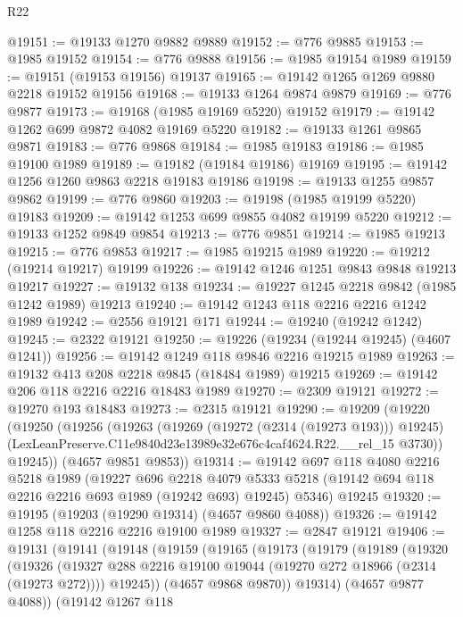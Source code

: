\begin{lexlean}{R22}
\begin{coremodule}
@19151 := @19133 @1270 @9882 @9889
@19152 := @776 @9885
@19153 := @1985 @19152
@19154 := @776 @9888
@19156 := @1985 @19154 @1989
@19159 := @19151 (@19153 @19156) @19137
@19165 := @19142 @1265 @1269 @9880 @2218 @19152 @19156
@19168 := @19133 @1264 @9874 @9879
@19169 := @776 @9877
@19173 := @19168 (@1985 @19169 @5220) @19152
@19179 := @19142 @1262 @699 @9872 @4082 @19169 @5220
@19182 := @19133 @1261 @9865 @9871
@19183 := @776 @9868
@19184 := @1985 @19183
@19186 := @1985 @19100 @1989
@19189 := @19182 (@19184 @19186) @19169
@19195 := @19142 @1256 @1260 @9863 @2218 @19183 @19186
@19198 := @19133 @1255 @9857 @9862
@19199 := @776 @9860
@19203 := @19198 (@1985 @19199 @5220) @19183
@19209 := @19142 @1253 @699 @9855 @4082 @19199 @5220
@19212 := @19133 @1252 @9849 @9854
@19213 := @776 @9851
@19214 := @1985 @19213
@19215 := @776 @9853
@19217 := @1985 @19215 @1989
@19220 := @19212 (@19214 @19217) @19199
@19226 := @19142 @1246 @1251 @9843 @9848 @19213 @19217
@19227 := @19132 @138
@19234 := @19227 @1245 @2218 @9842 (@1985 @1242 @1989) @19213
@19240 := @19142 @1243 @118 @2216 @2216 @1242 @1989
@19242 := @2556 @19121 @171
@19244 := @19240 (@19242 @1242)
@19245 := @2322 @19121
@19250 := @19226 (@19234 (@19244 @19245) (@4607 @1241))
@19256 := @19142 @1249 @118 @9846 @2216 @19215 @1989
@19263 := @19132 @413 @208 @2218 @9845 (@18484 @1989) @19215
@19269 := @19142 @206 @118 @2216 @2216 @18483 @1989
@19270 := @2309 @19121
@19272 := @19270 @193 @18483
@19273 := @2315 @19121
@19290 := @19209
    (@19220
      (@19250
        (@19256
          (@19263
            (@19269 (@19272 (@2314 (@19273 @193))) @19245)
            (LexLeanPreserve.C11e9840d23e13989e32e676c4caf4624.R22.__rel_15 @3730))
          @19245))
      (@4657 @9851 @9853))
@19314 := @19142
    @697
    @118
    @4080
    @2216
    @5218
    @1989
    (@19227
      @696
      @2218
      @4079
      @5333
      @5218
      (@19142 @694 @118 @2216 @2216 @693 @1989 (@19242 @693) @19245)
      @5346)
    @19245
@19320 := @19195 (@19203 (@19290 @19314) (@4657 @9860 @4088))
@19326 := @19142 @1258 @118 @2216 @2216 @19100 @1989
@19327 := @2847 @19121
@19406 := @19131
    (@19141
      (@19148
        (@19159
          (@19165
            (@19173
              (@19179
                (@19189
                  (@19320
                    (@19326
                      (@19327 @288 @2216 @19100 @19044 (@19270 @272 @18966 (@2314 (@19273 @272))))
                      @19245))
                  (@4657 @9868 @9870))
                @19314)
              (@4657 @9877 @4088))
            (@19142
              @1267
              @118

\end{coremodule}
\end{lexlean}
